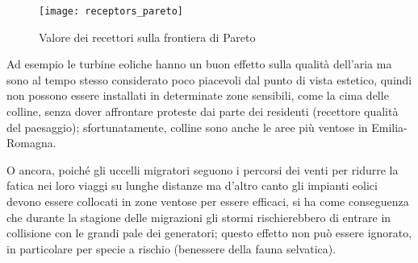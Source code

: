 \begin{figure}[h]
	\centering
	\texttt{[image: receptors\_pareto]}
	\caption{Valore dei recettori sulla frontiera di Pareto}
	\label{receptors_pareto}
\end{figure}

Ad esempio le turbine eoliche hanno un buon effetto sulla qualità dell'aria ma sono al tempo stesso considerato poco piacevoli dal punto di vista estetico, quindi non possono essere installati in determinate zone sensibili, come la cima delle colline, senza dover affrontare proteste dai parte dei residenti (recettore qualità del paesaggio); sfortunatamente, colline sono anche le aree più ventose in Emilia-Romagna. 

O ancora, poiché gli uccelli migratori seguono i percorsi dei venti per ridurre la fatica nei loro viaggi su lunghe distanze ma d'altro canto gli impianti eolici devono essere collocati in zone ventose per essere efficaci, si ha come conseguenza che durante la stagione delle migrazioni gli stormi rischierebbero di entrare in collisione con le grandi pale dei generatori; questo effetto non può essere ignorato, in particolare per specie a rischio (benessere della fauna selvatica).

%
%

%
